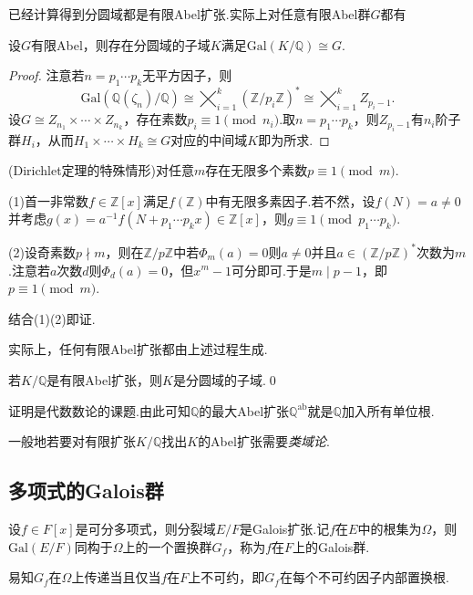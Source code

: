 已经计算得到分圆域都是有限Abel扩张.实际上对任意有限Abel群$G$都有
\begin{prop}
    设$G$有限Abel，则存在分圆域的子域$K$满足$\mathrm{Gal}(K/\mathbb{Q})\cong G$.
\end{prop}
\begin{proof}
    注意若$n=p_1\cdots p_k$无平方因子，则
    \[
        \mathrm{Gal}(\mathbb{Q}(\zeta_n)/\mathbb{Q})\cong\bigtimes_{i=1}^k(\mathbb{Z}/p_i\mathbb{Z})^*\cong\bigtimes_{i=1}^kZ_{p_i-1}.
    \]
    设$G\cong Z_{n_1}\times\cdots\times Z_{n_k}$，存在素数$p_i\equiv 1\pmod{n_i}$.取$n=p_1\cdots p_k$，则$Z_{p_i-1}$有$n_i$阶子群$H_i$，从而$H_1\times\cdots\times H_k\cong G$对应的中间域$K$即为所求.
\end{proof}
\begin{remark}
    (Dirichlet定理的特殊情形)对任意$m$存在无限多个素数$p\equiv 1\pmod m$.

    (1)首一非常数$f\in\mathbb{Z}[x]$满足$f(\mathbb{Z})$中有无限多素因子.若不然，设$f(N)=a\ne 0$并考虑$g(x)=a^{-1}f(N+p_1\cdots p_kx)\in\mathbb{Z}[x]$，则$g\equiv 1\pmod{p_1\cdots p_k}$.

    (2)设奇素数$p\nmid m$，则在$\mathbb{Z}/p\mathbb{Z}$中若$\Phi_m(a)=0$则$a\ne 0$并且$a\in(\mathbb{Z}/p\mathbb{Z})^*$次数为$m$.注意若$a$次数$d$则$\Phi_d(a)=0$，但$x^m-1$可分即可.于是$m\mid p-1$，即$p\equiv 1\pmod m$.

    结合(1)(2)即证.
\end{remark}

实际上，任何有限Abel扩张都由上述过程生成.
\begin{thm}
    若$K/\mathbb{Q}$是有限Abel扩张，则$K$是分圆域的子域.\qed
\end{thm}

证明是代数数论的课题.由此可知$\mathbb{Q}$的最大Abel扩张$\mathbb{Q}^{\text{ab}}$就是$\mathbb{Q}$加入所有单位根.

一般地若要对有限扩张$K/\mathbb{Q}$找出$K$的Abel扩张需要\emph{类域论}.

\subsection{多项式的Galois群}
设$f\in F[x]$是可分多项式，则分裂域$E/F$是Galois扩张.记$f$在$E$中的根集为$\Omega$，则$\mathrm{Gal}(E/F)$同构于$\Omega$上的一个置换群$G_f$，称为$f$在$F$上的{\heiti Galois群}.

\begin{remark}
    易知$G_f$在$\Omega$上传递当且仅当$f$在$F$上不可约，即$G_f$在每个不可约因子内部置换根.
\end{remark}

